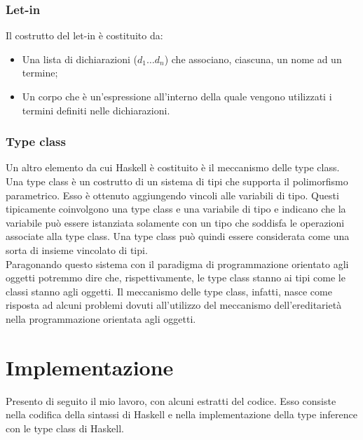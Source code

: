 \documentclass[12pt,a4paper,openright,twoside]{report}
\begin{document}
\subsection{Let-in}
Il costrutto del let-in è costituito da:
\begin{itemize}
 \item Una lista di dichiarazioni ($d_1 \ldots d_n$) che associano, ciascuna, un nome ad un termine;
 \item Un corpo che è un'espressione all'interno della quale vengono utilizzati i termini definiti nelle dichiarazioni.
\end{itemize}

\subsection{Type class}
Un altro elemento da cui Haskell è costituito è il meccanismo delle type class. Una type class è un costrutto di un sistema di tipi che supporta il polimorfismo parametrico. Esso è ottenuto aggiungendo vincoli alle variabili di tipo. Questi tipicamente coinvolgono una type class e una variabile di tipo e indicano che la variabile può essere istanziata solamente con un tipo che soddisfa le operazioni associate alla type class. Una type class può quindi essere considerata come una sorta di insieme vincolato di tipi.\\
Paragonando questo sistema con il paradigma di programmazione orientato agli oggetti potremmo dire che, rispettivamente, le type class stanno ai tipi come le classi stanno agli oggetti. Il meccanismo delle type class, infatti, nasce come risposta ad alcuni problemi dovuti all'utilizzo del meccanismo dell'ereditarietà nella programmazione orientata agli oggetti.

\clearpage{\pagestyle{empty}\cleardoublepage}	%


\chapter{Implementazione}		%


Presento di seguito il mio lavoro, con alcuni estratti del codice. Esso consiste nella codifica della sintassi di Haskell e nella implementazione della type inference con le type class di Haskell.
\end{document}
